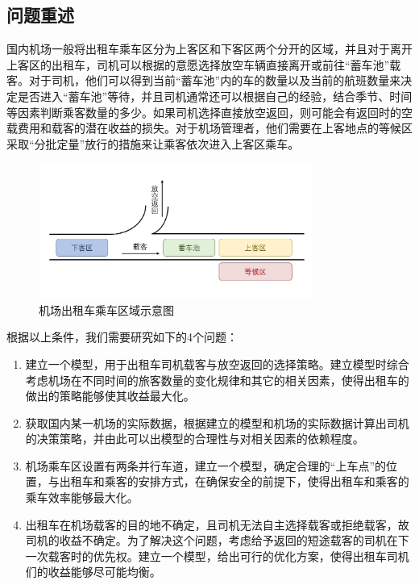 \documentclass{cumcm}
\begin{document}
\subsection{问题重述}
国内机场一般将出租车乘车区分为上客区和下客区两个分开的区域，并且对于离开上客区的出租车，司机可以根据的意愿选择放空车辆直接离开或前往“蓄车池”载客。对于司机，他们可以得到当前“蓄车池”内的车的数量以及当前的航班数量来决定是否进入“蓄车池”等待，并且司机通常还可以根据自己的经验，结合季节、时间等因素判断乘客数量的多少。如果司机选择直接放空返回，则可能会有返回时的空载费用和载客的潜在收益的损失。对于机场管理者，他们需要在上客地点的等候区采取“分批定量”放行的措施来让乘客依次进入上客区乘车。\par
\begin{figure}[H]
	\centering
	\includegraphics[width=0.8\textwidth]{img/taxi_example.jpg}
	\caption{机场出租车乘车区域示意图}
	\label{taxi_example}
\end{figure}
根据以上条件，我们需要研究如下的4个问题：
\begin{enumerate}[(1)]
	\item 建立一个模型，用于出租车司机载客与放空返回的选择策略。建立模型时综合考虑机场在不同时间的旅客数量的变化规律和其它的相关因素，使得出租车的做出的策略能够使其收益最大化。
	\item 获取国内某一机场的实际数据，根据建立的模型和机场的实际数据计算出司机的决策策略，并由此可以出模型的合理性与对相关因素的依赖程度。
	\item 机场乘车区设置有两条并行车道，建立一个模型，确定合理的“上车点”的位置，与出租车和乘客的安排方式，在确保安全的前提下，使得出租车和乘客的乘车效率能够最大化。
	\item 出租车在机场载客的目的地不确定，且司机无法自主选择载客或拒绝载客，故司机的收益不确定。为了解决这个问题，考虑给予返回的短途载客的司机在下一次载客时的优先权。建立一个模型，给出可行的优化方案，使得出租车司机们的收益能够尽可能均衡。
\end{enumerate}
\end{document}
